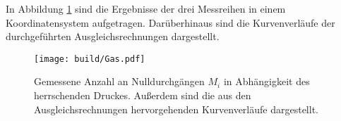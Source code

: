 In Abbildung \ref{fig:lorentz} sind die Ergebnisse der drei Messreihen in einem Koordinatensystem aufgetragen. 
Darüberhinaus sind die Kurvenverläufe der durchgeführten Ausgleichsrechnungen dargestellt.

\begin{figure}
    \centering
    \texttt{[image: build/Gas.pdf]}
    \caption{Gemessene Anzahl an Nulldurchgängen $M_i$ in Abhängigkeit des herrschenden Druckes. Außerdem sind die aus den Ausgleichsrechnungen hervorgehenden Kurvenverläufe dargestellt.}
    \label{fig:lorentz}
\end{figure}




%
